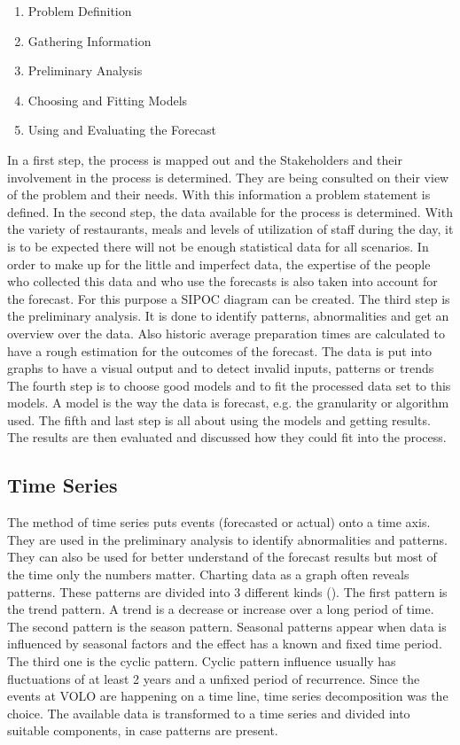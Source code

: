 \begin{enumerate}
\item Problem Definition
\item Gathering Information
\item Preliminary Analysis
\item Choosing and Fitting Models
\item Using and Evaluating the Forecast
\end{enumerate}

In a first step, the process is mapped out and the Stakeholders and their involvement in the process is determined. They are being consulted on their view of the problem and their needs. With this information a problem statement is defined.\newline
In the second step, the data available for the process is determined. With the variety of restaurants, meals and levels of utilization of staff during the day, it is to be expected there will not be enough statistical data for all scenarios. In order to make up for the little and imperfect data, the expertise of the people who collected this data and who use the forecasts is also taken into account for the forecast. For this purpose a SIPOC diagram can be created.\newline
The third step is the preliminary analysis. It is done to identify patterns, abnormalities and get an overview over the data. Also historic average preparation times are calculated to have a rough estimation for the outcomes of the forecast. The data is put into graphs to have a visual output and to detect invalid inputs, patterns or trends\newline
The fourth step is to choose good models and to fit the processed data set to this models. A model is the way the data is forecast, e.g. the granularity or algorithm used.\newline
The fifth and last step is all about using the models and getting results. The results are then evaluated and discussed how they could fit into the process.
\subsection{Time Series}\label{subsection:Time Series}
The method of time series puts events (forecasted or actual) onto a time axis.
They are used in the preliminary analysis to identify abnormalities and patterns. They can also be used for better understand of the forecast results but most of the time only the numbers matter. Charting data as a graph often reveals patterns. These patterns are divided into 3 different kinds (\cite{Hyndman.2013}). The first pattern is the trend pattern. A trend is a decrease or increase over a long period of time. The second pattern is the season pattern. Seasonal patterns appear when data is influenced by seasonal factors and the effect has a known and fixed time period. The third one is the cyclic pattern. Cyclic pattern influence usually has fluctuations of at least 2 years and a unfixed period of recurrence.\newline
Since the events at VOLO are happening on a time line, time series decomposition was the choice. The available data is transformed to a time series and divided into suitable components, in case patterns are present.
